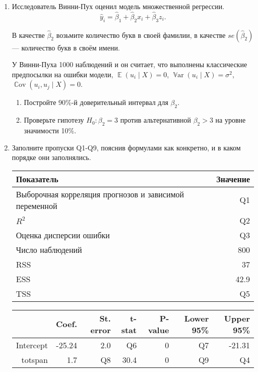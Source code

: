 \documentclass[12pt]{article}
\DeclareMathOperator{\Cov}{\mathbb{C}ov}
\DeclareMathOperator{\E}{\mathbb{E}}
\DeclareMathOperator{\Var}{\mathbb{V}ar}
\begin{document}
\newpage
\begin{enumerate}
    \item Исследователь Винни-Пух оценил модель множественной регрессии.
    \[
    \hat y_i = \hat\beta_1 + \hat\beta_2 x_i + \hat\beta_3 z_i.
    \]

    В качестве $\hat\beta_2$ возьмите количество букв в своей фамилии,
    в качестве $se(\hat\beta_2)$ — количество букв в своём имени. 

    У Винни-Пуха 1000 наблюдений и он считает, что выполнены классические предпосылки 
    на ошибки модели, $\E(u_i \mid X) = 0$, $\Var(u_i \mid X) = \sigma^2$, 
    $\Cov(u_i, u_j \mid X) = 0$.


    \begin{enumerate}
        \item Постройте 90\%-й доверительный интервал для $\beta_2$.
        \item Проверьте гипотезу $H_0: \beta_2 = 3$ против альтернативной 
        $\beta_2 > 3$ на уровне значимости 10\%.
    \end{enumerate}

    \item Заполните пропуски Q1-Q9, пояснив формулами как конкретно, и в каком порядке они заполнялись.
    
    \begin{tabular}{lr} \toprule
    Показатель & Значение \\
    \midrule
    Выборочная корреляция прогнозов и зависимой переменной  & Q1 \\
    $R^2$     			& Q2 \\
    Оценка дисперсии ошибки 		& Q3 \\
    Число наблюдений		& 800 \\
    RSS & 37 \\
    ESS & 42.9 \\
    TSS & Q5 \\
    \bottomrule
    \end{tabular}


    \begin{tabular}{rrrrrrr}
    \toprule
                 & Coef. 	& St. error	& t-stat & P-value	& Lower 95\% 	& Upper 95\% \\
    \midrule
    Intercept 	& -25.24 	& 2.0 	& Q6 		& 0 	&  Q7		& -21.31 \\
    totspan		& 1.7		& Q8    & 30.4 	    & 0 	&  Q9	    & Q4 \\
    \bottomrule
    \end{tabular}
    

\end{enumerate}
\end{document}
